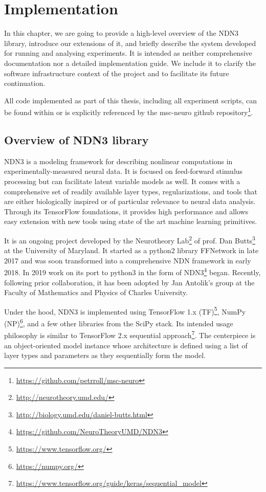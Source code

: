 \chapter{Implementation}\label{ch:3}
In this chapter, we are going to provide a high-level overview of the NDN3 library, introduce our extensions of it, and briefly describe the system developed for running and analysing experiments. It is intended as neither comprehensive documentation nor a detailed implementation guide. We include it to clarify the software infrastructure context of the project and to facilitate its future continuation. 

All code implemented as part of this thesis, including all experiment scripts, can be found within or is explicitly referenced by the msc-neuro github repository\footnote{\href{https://github.com/petrroll/msc-neuro}{https://github.com/petrroll/msc-neuro}}.

\section{Overview of NDN3 library}
NDN3 is a modeling framework for describing nonlinear computations in expe\-rimentally-measured neural data. It is focused on feed-forward stimulus processing but can facilitate latent variable models as well. It comes with a comprehensive set of readily available layer types, regularizations, and tools that are either biologically inspired or of particular relevance to neural data analysis. Through its TensorFlow foundations, it provides high performance and allows easy extension with new tools using state of the art machine learning primitives.

It is an ongoing project developed by the Neurotheory Lab\footnote{\href{http://neurotheory.umd.edu/}{http://neurotheory.umd.edu/}} of prof. Dan Butts\footnote{\href{http://biology.umd.edu/daniel-butts.html}{http://biology.umd.edu/daniel-butts.html}} at the University of Maryland. It started as a python2 library FFNetwork in late 2017 and was soon transformed into a comprehensive NDN framework in early 2018. In 2019 work on its port to python3 in the form of NDN3\footnote{\href{https://github.com/NeuroTheoryUMD/NDN3}{https://github.com/NeuroTheoryUMD/NDN3}} began. Recently, following prior collaboration, it has been adopted by Jan Antolik’s group at the Faculty of Mathematics and Physics of Charles University. 

Under the hood, NDN3 is implemented using TensorFlow 1.x (TF)\footnote{\href{https://www.tensorflow.org/}{https://www.tensorflow.org/}}, NumPy (NP)\footnote{\href{https://numpy.org/}{https://numpy.org/}}, and a few other libraries from the SciPy stack. Its intended usage philosophy is similar to TensorFlow 2.x sequential approach\footnote{\href{https://www.tensorflow.org/guide/keras/sequential_model}{https://www.tensorflow.org/guide/keras/sequential\_model}}. The centerpiece is an object-oriented model instance whose architecture is defined using a list of layer types and parameters as they sequentially form the model.

